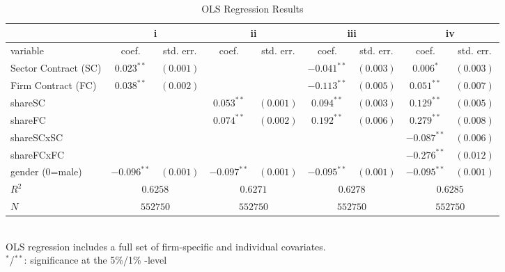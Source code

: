 \newpage
\begin{landscape}
\begin{table}[]
\scriptsize
\centering
\caption{OLS Regression Results}
\label{OLS}
\begin{tabular}{l|cccccccc}
 & \multicolumn{2}{c}{i} & \multicolumn{2}{c}{ii} & \multicolumn{2}{c}{iii} & \multicolumn{2}{c}{iv} \\
\hline
variable & coef. & std. err. & coef. & std. err. & coef. & std. err. & coef. & std. err. \\
\hline
Sector Contract (SC)    & $0.023^{**}$ & $(0.001)$ &  &  & $-0.041^{**}$ & $(0.003)$ & $0.006^{*}$ & $(0.003)$\\
Firm Contract (FC)      & $0.038^{**}$ & $(0.002)$ &  &  & $-0.113^{**}$ & $(0.005)$ & $0.051^{**}$ & $(0.007)$\\
shareSC                 &  &  & $0.053^{**}$ & $(0.001)$ & $0.094^{**}$ & $(0.003)$ & $0.129^{**}$ & $(0.005)$\\
shareFC                 &  &  & $0.074^{**}$ & $(0.002)$ & $0.192^{**}$ & $(0.006)$ & $0.279^{**}$ & $(0.008)$\\
shareSCxSC              &  &  &  &  &  &  & $-0.087^{**}$ & $(0.006)$\\
shareFCxFC              &  &  &  &  &  &  & $-0.276^{**}$ & $(0.012)$\\
gender (0=male)         & $-0.096^{**}$ & $(0.001)$ & $-0.097^{**}$ & $(0.001)$ & $-0.095^{**}$ & $(0.001)$ & $-0.095^{**}$ & $(0.001)$\\
\hline
$R^{2}$                 & \multicolumn{2}{c}{$0.6258$} & \multicolumn{2}{c}{$0.6271$} & \multicolumn{2}{c}{$0.6278$} & \multicolumn{2}{c}{$0.6285$}  \\
$N$                     & \multicolumn{2}{c}{$552750$} & \multicolumn{2}{c}{$552750$} & \multicolumn{2}{c}{$552750$} & \multicolumn{2}{c}{$552750$}  \\
\hline
\end{tabular}\\
\bigskip
OLS regression includes a full set of firm-specific and individual covariates.\\
$^{*}$/$^{**}$: significance at the 5\%/1\% -level
\end{table}


\end{landscape}
